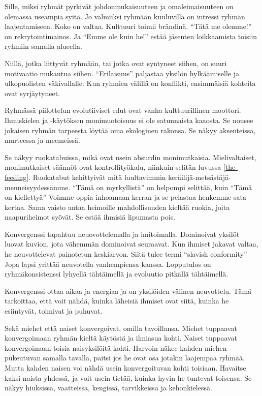Sille, miksi ryhmät pyrkivät johdonmukaisuuteen ja omaleimaisuuteen on olemassa useampia syitä. Jo valmiiksi ryhmään kuuluvilla on intressi ryhmän laajentamiseen. Koko on valtaa. Kulttuuri toimii brändinä. ``Tätä me olemme!'' on rekrytointimainos. Ja ``Emme ole kuin he!'' estää jäsenten loikkaamista toisiin ryhmiin samalla alueella.

Niillä, jotka liittyvät ryhmään, tai jotka ovat syntyneet siihen, on suuri motivaatio mukautua siihen. ``Erilaisuus'' paljastaa yksilön hylkäämiselle ja ulkopuolisten väkivallalle. Kun ryhmien välillä on konflikti, ensimmäisiä kohteita ovat syrjäytyneet.

Ryhmässä piilottelun evolutiiviset edut ovat vanha kulttuurillinen moottori. Ihmiskielen ja -käytöksen monimuotoisuus ei ole satunnaista kaaosta. Se nousee jokaisen ryhmän tarpeesta löytää oma ekologinen rakonsa. Se näkyy aksenteissa, murteessa ja meemeissä.

Se näkyy ruokatabuissa, mikä ovat usein absurdin monimutkaisia. Mielivaltaiset, monimutkaiset säännöt ovat kontrollityökalu, niinkuin selitän luvussa \ref{the-feeding}. Ruokatabut kehittyivät mitä luultavimmin keräilijä-metsästäjä-menneisyydessämme. ``Tämä on myrkyllistä'' on helpompi selittää, kuin ``Tämä on kiellettyä'' Voimme oppia inhoamaan kerran ja se pelastaa henkemme sata kertaa. Sama vaisto antaa heimoille mahdollisuuden kieltää ruokia, joita naapuriheimot syövät. Se estää ihmisiä lipumasta pois.

Konvergenssi tapahtuu neuovottelemalla ja imitoimalla. Dominoivat yksilöt luovat kuvion, jota vähemmän dominoivat seuraavat. Kun ihmiset jakavat valtaa, he neuvottelevat painotetun keskiarvon. Siitä tulee termi ``slavish conformity'' Jopa lapsi yrittää neuvotella vanhempiensa kanssa. Lopputulos on ryhmäkonsistenssi lyhyellä tähtäimellä ja evoluutio pitkällä tähtäimellä.

Konvergenssi ottaa aikaa ja energiaa ja on yksilöiden välinen neuvottelu. Tämä tarkoittaa, että voit nähdä, kuinka läheisiä ihmiset ovat siitä, kuinka he esiintyvät, toimivat ja puhuvat.

Sekä miehet että naiset konvergoivat, omilla tavoillansa. Miehet tuppaavat konvergoimaan ryhmän kieltä käytöstä ja ilmiasua kohti. Naiset tuppaavat konvergoimaan toisia naisyksilöitä kohti. Harvoin näkee kahden miehen pukeutuvan samalla tavalla, paitsi jos he ovat osa jotakin laajempaa ryhmää. Mutta kahden naisen voi nähdä usein konvergoituvan kohti toisiaan. Havaitse kaksi naista yhdessä, ja voit usein tietää, kuinka hyvin he tuntevat toisensa. Se näkyy hiuksissa, vaatteissa, kengissä, tarvikkeissa ja kehonkielessä.

